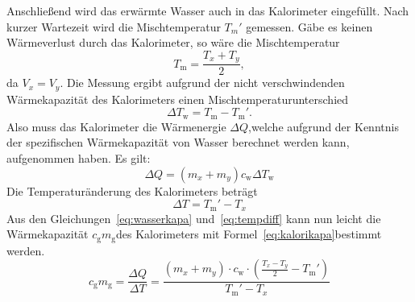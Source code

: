 Anschließend wird das erwärmte Wasser auch in das Kalorimeter eingefüllt.
Nach kurzer Wartezeit wird die Mischtemperatur $T_m'$ gemessen.
Gäbe es keinen Wärmeverlust durch das Kalorimeter, so wäre die Mischtemperatur
\begin{equation}
\label{eq:mischtemp1}
T_\text{m} = \frac{T_x + T_y}{2},
\end{equation}
da $V_x = V_y$.
Die Messung ergibt aufgrund der nicht verschwindenden Wärmekapazität 
des Kalorimeters einen Mischtemperaturunterschied 
\begin{equation}
\label{eq:mischtemp2}
\Delta T_\text{w} = T_\text{m} - T_\text{m}'.
\end{equation}
Also muss das Kalorimeter die Wärmenergie $\Delta Q$,welche aufgrund 
der Kenntnis der spezifischen Wärmekapazität von Wasser berechnet 
werden kann, aufgenommen haben.
Es gilt:
\begin{equation}
\label{eq:wasserkapa}
\Delta Q = (m_x + m_y)c_\text{w}\Delta T_\text{w}
\end{equation}
%
Die Temperaturänderung des Kalorimeters beträgt 
\begin{equation}
\label{eq:tempdiff}
\Delta T = T_\text{m}' - T_x
\end{equation}
Aus den Gleichungen~\eqref{eq:wasserkapa} und~\eqref{eq:tempdiff} 
kann nun leicht die Wärmekapazität $c_\text{g}m_\text{g}$des Kalorimeters 
 mit Formel~\eqref{eq:kalorikapa}bestimmt werden. 
%
\begin{equation}
\label{eq:kalorikapa}
c_\text{g}m_\text{g} =\frac{\Delta Q}{\Delta T} = \frac{(m_x +m_y)\cdot c_\text{w}\cdot\left(\frac{T_x - T_y}{2} - T_\text{m}'\right)}{T_\text{m}' - T_x}
\end{equation}